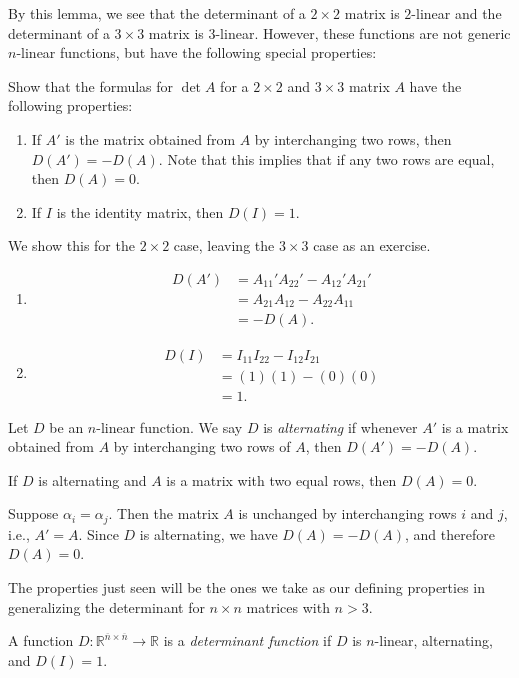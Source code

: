 \documentclass[12pt,letterpaper,reqno]{article}
\numberwithin{equation}{section}
\newcommand{\ti}[1]{\textit{#1}}
\begin{document}
By this lemma, we see that the determinant of a $2 \times 2$ matrix is $2$-linear and the determinant of a $3 \times 3$ matrix is $3$-linear. However, these functions are not generic $n$-linear functions, but have the following special properties:

\begin{exercise}
Show that the formulas for $\det A$	for a $2 \times 2$ and $3 \times 3$ matrix $A$ have the following properties:
\begin{enumerate}[(1)]
	\item If $A'$ is the matrix obtained from $A$ by interchanging two rows, then $D(A')=-D(A)$. Note that this implies that if any two rows are equal, then $D(A)=0$.
	\item If $I$ is the identity matrix, then $D(I)=1$.
\end{enumerate}
\end{exercise}

{\color{red} 
We show this for the $2 \times 2$ case, leaving the $3 \times 3$ case as an exercise.
\begin{enumerate}[(1)]
	\item
	\begin{align*}
		D(A')&=A_{11}'A_{22}'-A_{12}'A_{21}' \\
		&=A_{21}A_{12}-A_{22}A_{11} \\
		&=-D(A).
	\end{align*}
	\item 
		\begin{align*}
			D(I)&=I_{11}I_{22}-I_{12}I_{21} \\
			    &=(1)(1)-(0)(0) \\
			    &=1.
		\end{align*}
\end{enumerate}}

\begin{defn}
	Let $D$ be an $n$-linear function. We say $D$ is \ti{alternating} if whenever $A'$ is a matrix obtained from $A$ by interchanging two rows of $A$, then $D(A')=-D(A)$.
\end{defn}

\begin{prop}
	If $D$ is alternating and $A$ is a matrix with two equal rows, then $D(A)=0$. 
\end{prop}

\begin{pf}
	Suppose $\alpha_i=\alpha_j$. Then the matrix $A$ is unchanged by interchanging rows $i$ and $j$, i.e., $A'=A$. Since $D$ is alternating, we have $D(A)=-D(A)$, and therefore $D(A)=0$.
\end{pf}
The properties just seen will be the ones we take as our defining properties in generalizing the determinant for $n \times n$ matrices with $n>3$.
\begin{defn}
	A function $D:\mathbb{R}^{\overline{n} \times \overline{n}} \to \mathbb{R}$ is a \ti{determinant function} if $D$ is $n$-linear, alternating, and $D(I)=1$.
\end{defn}
\end{document}
